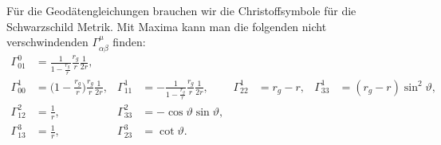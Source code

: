 %
Für die Geodätengleichungen brauchen wir die Christoffsymbole 
für die Schwarzschild Metrik.
Mit Maxima kann man die folgenden nicht verschwindenden
$\Gamma^\mu_{\alpha\beta}$ 
finden:
\begin{align*}
\Gamma^0_{01}
&=
\frac{1}{1-\displaystyle\frac{r_g}{r}}
\frac{r_g}{r}
\frac{1}{2r},
\\
\Gamma^1_{00}
&=
\biggl(1-\displaystyle\frac{r_g}{r}\biggr)
\frac{r_g}{r}
\frac{1}{2r},
&
\Gamma^1_{11}
&=
-\frac1{1-\displaystyle\frac{r_g}{r}}
\frac{r_g}{r}
\frac{1}{2r},
&
\Gamma^1_{22}
&=
r_g-r,
&
\Gamma^1_{33}
&=
(r_g-r)\sin^2\vartheta,
\\
\Gamma^2_{12}
&=
\frac1r,
&
\Gamma^2_{33}
&=
-\cos\vartheta \sin\vartheta,
\\
\Gamma^3_{13}
&=
\frac1r,
&
\Gamma^3_{23}
&=
\cot\vartheta.
\end{align*}

